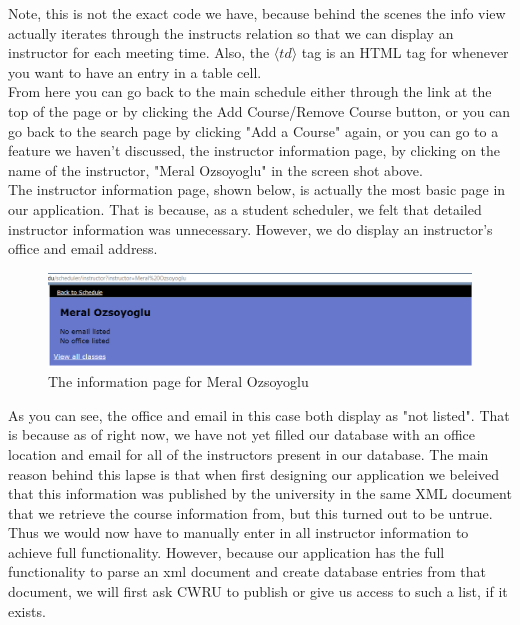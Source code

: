 \documentclass[pdftex,12pt,letter]{article}
\begin{document}
Note, this is not the exact code we have, because behind the scenes the info view actually iterates through the instructs relation so that we can display an instructor for each meeting time. Also, the $\langle td \rangle$ tag is an HTML tag for whenever you want to have an entry in a table cell.\\

From here you can go back to the main schedule either through the link at the top of the page or by clicking the Add Course/Remove Course button, or you can go back to the search page by clicking "Add a Course" again, or you can go to a feature we haven't discussed, the instructor information page, by clicking on the name of the instructor, "Meral Ozsoyoglu" in the screen shot above.\\

The instructor information page, shown below, is actually the most basic page in our application. That is because, as a student scheduler, we felt that detailed instructor information was unnecessary. However, we do display an instructor's office and email address.
\begin{figure}
\includegraphics[width=6in]{meral.png}
\caption{The information page for Meral Ozsoyoglu}
\end{figure}
\FloatBarrier
As you can see, the office and email in this case both display as "not listed". That is because as of right now, we have not yet filled our database with an office location and email for all of the instructors present in our database. The main reason behind this lapse is that when first designing our application we beleived that this information was published by the university in the same XML document that we retrieve the course information from, but this turned out to be untrue. Thus we would now have to manually enter in all instructor information to achieve full functionality. However, because our application has the full functionality to parse an xml document and create database entries from that document, we will first ask CWRU to publish or give us access to such a list, if it exists.\\
\end{document}
